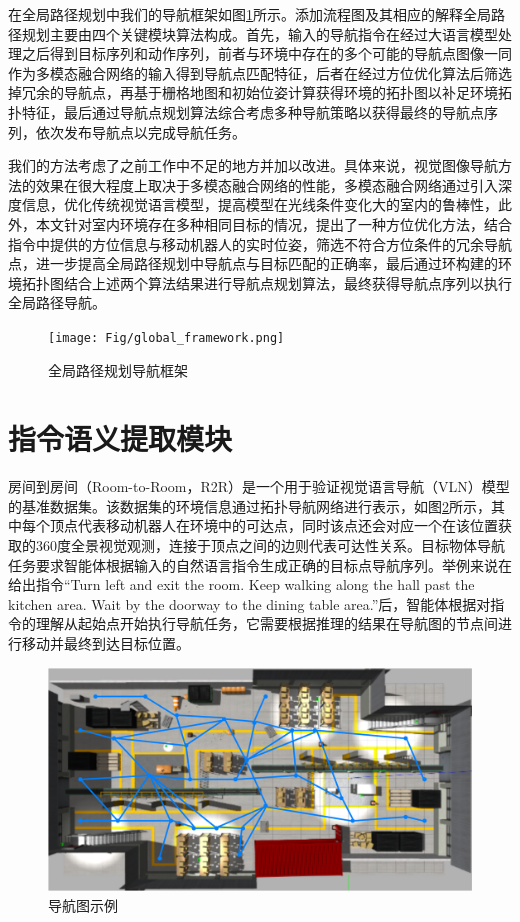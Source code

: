 在全局路径规划中我们的导航框架如图\ref{global_framework}所示。$添加流程图及其相应的解释$全局路径规划主要由四个关键模块算法构成。首先，输入的导航指令在经过大语言模型处理之后得到目标序列和动作序列，前者与环境中存在的多个可能的导航点图像一同作为多模态融合网络的输入得到导航点匹配特征，后者在经过方位优化算法后筛选掉冗余的导航点，再基于栅格地图和初始位姿计算获得环境的拓扑图以补足环境拓扑特征，最后通过导航点规划算法综合考虑多种导航策略以获得最终的导航点序列，依次发布导航点以完成导航任务。

我们的方法考虑了之前工作中不足的地方并加以改进。具体来说，视觉图像导航方法的效果在很大程度上取决于多模态融合网络的性能，多模态融合网络通过引入深度信息，优化传统视觉语言模型，提高模型在光线条件变化大的室内的鲁棒性，此外，本文针对室内环境存在多种相同目标的情况，提出了一种方位优化方法，结合指令中提供的方位信息与移动机器人的实时位姿，筛选不符合方位条件的冗余导航点，进一步提高全局路径规划中导航点与目标匹配的正确率，最后通过环构建的环境拓扑图结合上述两个算法结果进行导航点规划算法，最终获得导航点序列以执行全局路径导航。
\begin{figure}[htbp]
    \centering
    \texttt{[image: Fig/global\_framework.png]}
    \caption{\label{global_framework}全局路径规划导航框架}
\end{figure}


\section{指令语义提取模块}
房间到房间（Room-to-Room，R2R）是一个用于验证视觉语言导航（VLN）模型的基准数据集\cite{anderson2018vision}。该数据集的环境信息通过拓扑导航网络进行表示，如图\ref{r2r_nav}所示，其中每个顶点代表移动机器人在环境中的可达点，同时该点还会对应一个在该位置获取的360度全景视觉观测，连接于顶点之间的边则代表可达性关系。目标物体导航任务要求智能体根据输入的自然语言指令生成正确的目标点导航序列。举例来说在给出指令“Turn left and exit the room. Keep walking along the hall past the kitchen area. Wait by the doorway to the dining table area.”后，智能体根据对指令的理解从起始点开始执行导航任务，它需要根据推理的结果在导航图的节点间进行移动并最终到达目标位置。
\begin{figure}[htbp]
    \centering
    \includegraphics[scale=0.35]{Fig/导航图示例.png}
    \caption{\label{r2r_nav}导航图示例}
\end{figure}

